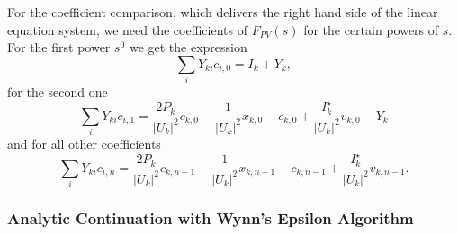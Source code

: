 For the coefficient comparison, which delivers the right hand side of the linear equation system, we need the coefficients of $F_{PV}(s)$ for the certain powers of $s$. For the first power $s^0$ we get the expression
\begin{equation}
	\sum_i Y_{ki} c_{i,0} = I_k + Y_k,
\end{equation}
for the second one
\begin{equation}
	\sum_i Y_{ki} c_{i,1} = \frac{2 P_k}{|U_k|^2} c_{k,0} - \frac{1}{|U_k|^2} x_{k,0} - c_{k,0} + \frac{I_k^\star}{|U_k|^2} v_{k,0} - Y_k
\end{equation}
and for all other coefficients
\begin{equation}
	\sum_i Y_{ki} c_{i,n} = \frac{2 P_k}{|U_k|^2} c_{k,n-1} - \frac{1}{|U_k|^2} x_{k,n-1} - c_{k,n-1} + \frac{I_k^\star}{|U_k|^2} v_{k,n-1}.
\end{equation}

\subsubsection{Analytic Continuation with Wynn's Epsilon Algorithm}

